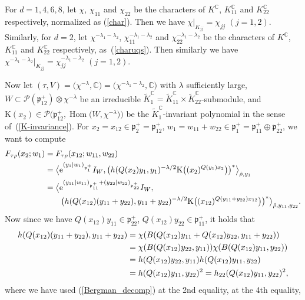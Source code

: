 \documentclass[pdftex]{sigma}
\numberwithin{equation}{section}
\newcommand{\BC}{\mathbb{C}}
\newcommand{\fp}{\mathfrak{p}}
\newcommand{\cP}{\mathcal{P}}
\newcommand{\rK}{\mathrm{K}}
\newcommand{\Hom}{\operatorname{Hom}}
\begin{document}
For $d=1,4,6,8$, let $\chi$, $\chi_{11}$ and $\chi_{22}$ be the characters of $K^\BC$, $K_{11}^\BC$ and $K_{22}^\BC$ respectively,
normalized as (\ref{char}). Then we have $\chi|_{K_{jj}}=\chi_{jj}$ $(j=1,2)$.
Similarly, for $d=2$, let $\chi^{-\lambda_1-\lambda_2}$, $\chi_{11}^{-\lambda_1-\lambda_2}$ and $\chi_{22}^{-\lambda_1-\lambda_2}$ be
the characters of $K^\BC$, $K_{11}^\BC$ and $K_{22}^\BC$ respectively, as~(\ref{charuqs}).
Then similarly we have $\chi^{-\lambda_1-\lambda_2}|_{K_{jj}}=\chi_{jj}^{-\lambda_1-\lambda_2}$ $(j=1,2)$.

Now let $(\tau,V)=\big(\chi^{-\lambda},\BC\big)=\big(\chi^{-\lambda_1-\lambda_2},\BC\big)$ with $\lambda$ sufficiently large,
$W\subset\cP(\fp^+_{12})\otimes\chi^{-\lambda}$ be an irreducible $\tilde{K}^\BC_1=\tilde{K}^\BC_{11}\times \tilde{K}^\BC_{22}$-submodule,
and $\rK(x_2)\in \cP\big(\fp^+_{12},\Hom\big(W,\chi^{-\lambda}\big)\big)$ be the $\tilde{K}^\BC_1$-invariant polynomial in the sense of~(\ref{K-invariance}).
For $x_2=x_{12}\in\fp^+_2=\fp^+_{12}$, $w_1=w_{11}+w_{22}\in\fp^+_1=\fp^+_{11}\oplus\fp^+_{22}$,
we want to compute
\begin{align*}
F_{\tau\rho}(x_2;w_1)&=F_{\tau\rho}(x_{12};w_{11},w_{22})\\
& =\big\langle {\rm e}^{(y_1|w_1)_{\fp^+_1}}I_W,
\big(h(Q(x_2)y_1,y_1)^{-\lambda/2}\rK\big((x_2)^{Q(y_1)x_2}\big)\big)^*\big\rangle_{\hat{\rho},y_1}\!\\
&=\bigl\langle {\rm e}^{(y_{11}|w_{11})_{\fp^+_{11}}+(y_{22}|w_{22})_{\fp^+_{22}}}I_W,\\
& \qquad \big(h(Q(x_{12})(y_{11}+y_{22}),y_{11}+y_{22})^{-\lambda/2}
\rK\big((x_{12})^{Q(y_{11}+y_{22})x_{12}}\big)\big)^*\bigr\rangle_{\hat{\rho},y_{11},y_{22}}.
\end{align*}
Now since we have $Q(x_{12})y_{11}\in\fp^+_{22}$, $Q(x_{12})y_{22}\in\fp^+_{11}$, it holds that
\begin{align}
h(Q(x_{12})(y_{11}+y_{22}),y_{11}+y_{22}) &=\chi(B(Q(x_{12})y_{11}+Q(x_{12})y_{22},y_{11}+y_{22})) \notag\\
& =\chi(B(Q(x_{12})y_{22},y_{11}))\chi(B(Q(x_{12})y_{11},y_{22})) \notag\\
& =h(Q(x_{12})y_{22},y_{11})h(Q(x_{12})y_{11},y_{22}) \notag\\
& =h(Q(x_{12})y_{11},y_{22})^2=h_{22}(Q(x_{12})y_{11},y_{22})^2,\label{generic_norm_square}
\end{align}
where we have used (\ref{Bergman_decomp}) at the 2nd equality, \cite[Part V, Propositions IV.3.4 and IV.3.5]{FKKLR} at the 4th equality,
\end{document}
